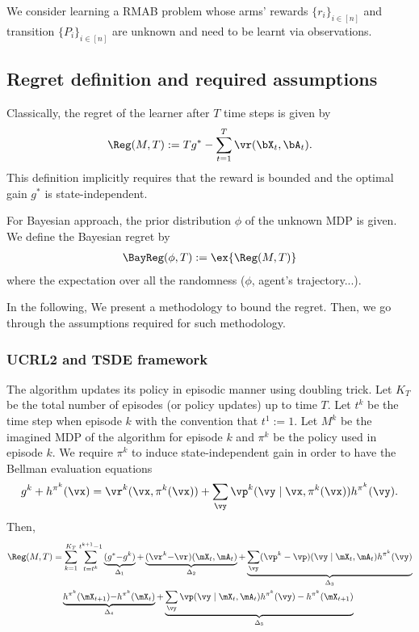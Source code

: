 We consider learning a RMAB problem whose arms' rewards $\{r_i\}_{i\in[n]}$ and transition $\{P_i\}_{i\in[n]}$ are unknown and need to be learnt via observations.

\subsection{Regret definition and required assumptions}

Classically, the regret of the learner after $T$ time steps is given by
\begin{align}
    \Reg(M,T) := Tg^* - \sum_{t=1}^{T} \vr(\bX_{t},\bA_{t}). \label{eq:regret}
\end{align}
This definition implicitly requires that the reward is bounded and the optimal gain $g^*$ is state-independent.

For Bayesian approach, the prior distribution $\phi$ of the unknown MDP is given.
We define the Bayesian regret by 
\begin{align}
    \BayReg(\phi, T) := \ex{\Reg(M, T)} \label{eq:bayreg}
\end{align}
where the expectation over all the randomness ($\phi$, agent's trajectory...).

In the following, We present a methodology to bound the regret.
Then, we go through the assumptions required for such methodology.

\subsubsection{UCRL2 and TSDE framework}

The algorithm updates its policy in episodic manner using doubling trick.
Let $K_T$ be the total number of episodes (or policy updates) up to time $T$.
Let $t^k$ be the time step when episode $k$ with the convention that $t^1:=1$.
Let $M^k$ be the imagined MDP of the algorithm for episode $k$ and $\pi^k$ be the policy used in episode $k$.
We require $\pi^k$ to induce state-independent gain in order to have the Bellman evaluation equations
\begin{align*}
    g^k +h^{\pi^k}(\vx) = \vr^k(\vx, \pi^k(\vx)) +\sum_{\vy}\vp^k(\vy \mid \vx, \pi^k(\vx))h^{\pi^k}(\vy).
\end{align*}
Then,
\begin{align*}
    \Reg(M, T)&=\sum_{k=1}^{K_T}\sum_{t=t^k}^{t^{k+1}-1} \underbrace{(g^*{-}g^k)}_{\Delta_1} {+}\underbrace{(\vr^k{-}\vr)(\mX_t,\mA_t)}_{\Delta_2} {+}\underbrace{\sum_{\vy}(\vp^k-\vp)(\vy \mid \mX_t, \mA_t)h^{\pi^k}(\vy)}_{\Delta_3}\\
              &\quad  \underbrace{h^{\pi^k}(\mX_{t+1}){-}h^{\pi^k}(\mX_{t})}_{\Delta_4} {+}\underbrace{\sum_{\vy}\vp(\vy \mid \mX_t, \mA_t)h^{\pi^k}(\vy)-h^{\pi^k}(\mX_{t+1})}_{\Delta_5}
\end{align*}

